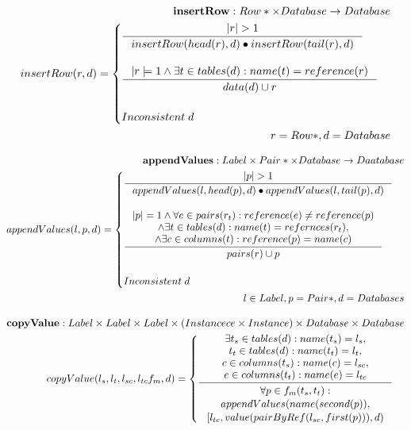 \documentclass[11pt]{article}
\begin{document}
\begin{align*}
	\mathbf{insertRow} : Row* \times Database \rightarrow Database \\
	insertRow(r, d) = \begin{cases}
			\inference{|r|>1}{insertRow(head(r), d) \bullet insertRow(tail(r), d)} \\ \\
		 	\inference{|r|=1 \wedge \exists t \in tables(d) : name(t) = reference(r) }{data(d) \cup r} \\ \\
			 Inconsistent \; d
		 \end{cases}	\\
		 r = Row*, d = Database
\end{align*}

\begin{align*}
	\mathbf{appendValues} : Label \times Pair* \times Database \rightarrow Daatabase \\
	appendValues(l, p, d) = \begin{cases}
 		\inference{|p| > 1}{appendValues(l, head(p), d)\bullet appendValues(l, tail(p), d)}  \\ \\
 		\inference{|p| = 1 \wedge \forall e \in pairs(r_t) : reference(e) \neq reference(p) \\ \wedge \exists t \in tables(d) : name(t) = refernces(r_t), \\ \wedge \exists c \in columns(t) : reference(p) = name(c)}{pairs(r) \cup p} \\ \\
	 	 Inconsistent \; d
 		\end{cases} \\
l \in Label, p = Pair*, d = Databases
\end{align*}

\begin{align*}
	\mathbf{copyValue} : Label \times Label \times Label \times (Instancece \times Instance) \times Database \times Database \\
	copyValue(l_s, l_t, l_{sc}, l_{tc} f_m, d) = \begin{cases}
 		\inference{\exists t_s \in tables(d) : name(t_s) = l_s, \\ t_t \in tables(d) : name(t_t) = l_t, \\ c \in columns(t_s) : name(c) = l_{sc}, \\ e \in columns(t_t) : name(e) = l_{tc} }{\begin{gathered}
			\forall p \in f_m(t_s, t_t)  : \\ appendValues(name(second(p)), \\ [l_{tc},value(pairByRef(l_{sc}, first(p))),d)
		\end{gathered}}
 	\end{cases}
\end{align*}
\end{document}
